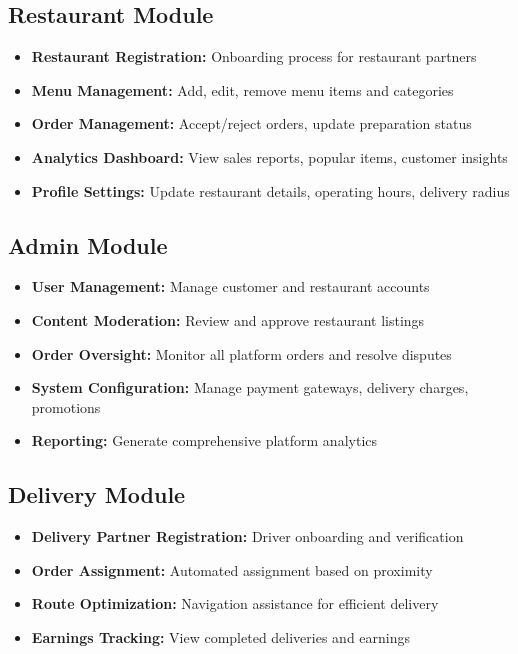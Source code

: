 \documentclass[12pt,a4paper]{report}
\begin{document}
\subsection{Restaurant Module}
\begin{itemize}[leftmargin=*]
    \item \textbf{Restaurant Registration:} Onboarding process for restaurant partners
    \item \textbf{Menu Management:} Add, edit, remove menu items and categories
    \item \textbf{Order Management:} Accept/reject orders, update preparation status
    \item \textbf{Analytics Dashboard:} View sales reports, popular items, customer insights
    \item \textbf{Profile Settings:} Update restaurant details, operating hours, delivery radius
\end{itemize}

\subsection{Admin Module}
\begin{itemize}[leftmargin=*]
    \item \textbf{User Management:} Manage customer and restaurant accounts
    \item \textbf{Content Moderation:} Review and approve restaurant listings
    \item \textbf{Order Oversight:} Monitor all platform orders and resolve disputes
    \item \textbf{System Configuration:} Manage payment gateways, delivery charges, promotions
    \item \textbf{Reporting:} Generate comprehensive platform analytics
\end{itemize}

\subsection{Delivery Module}
\begin{itemize}[leftmargin=*]
    \item \textbf{Delivery Partner Registration:} Driver onboarding and verification
    \item \textbf{Order Assignment:} Automated assignment based on proximity
    \item \textbf{Route Optimization:} Navigation assistance for efficient delivery
    \item \textbf{Earnings Tracking:} View completed deliveries and earnings
\end{itemize}
\end{document}
